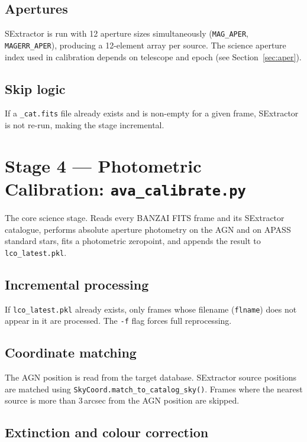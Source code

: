 \documentclass[12pt,a4paper]{article}
\begin{document}
\subsection{Apertures}

SExtractor is run with 12 aperture sizes simultaneously (\texttt{MAG\_APER},
\texttt{MAGERR\_APER}), producing a 12-element array per source.  The science aperture
index used in calibration depends on telescope and epoch (see Section~\ref{sec:aper}).

\subsection{Skip logic}

If a \texttt{\_cat.fits} file already exists and is non-empty for a given frame,
SExtractor is not re-run, making the stage incremental.

\section{Stage 4 --- Photometric Calibration: \texttt{ava\_calibrate.py}}
\label{sec:calibrate}

The core science stage.  Reads every BANZAI FITS frame and its SExtractor catalogue,
performs absolute aperture photometry on the AGN and on APASS standard stars, fits a
photometric zeropoint, and appends the result to \texttt{lco\_latest.pkl}.

\subsection{Incremental processing}

If \texttt{lco\_latest.pkl} already exists, only frames whose filename (\texttt{flname})
does not appear in it are processed.  The \texttt{-f} flag forces full reprocessing.

\subsection{Coordinate matching}

The AGN position is read from the target database.  SExtractor source positions are matched
using \texttt{SkyCoord.match\_to\_catalog\_sky()}.  Frames where the nearest source is more
than 3\,arcsec from the AGN position are skipped.

\subsection{Extinction and colour correction}
\end{document}
